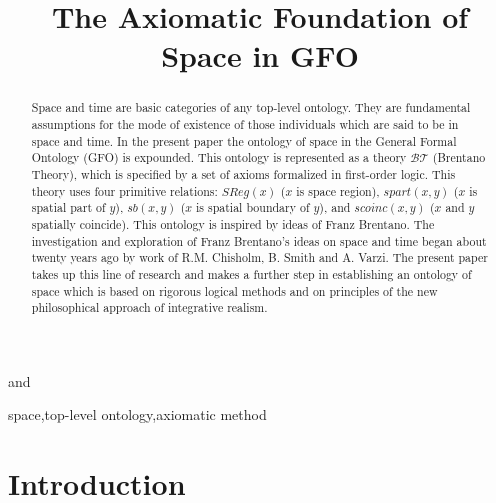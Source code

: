 \documentclass{ao2e}
\begin{document}
\begin{frontmatter}                           \title{The Axiomatic Foundation of Space in GFO}


\author[A]{ } and
\author[B]{ }
\address[A]{Department of Intelligent Systems, University of Leipzig\\
E-mail: baumann@informatik.uni-leipzig.de}
\address[B]{Institute for Medical Informatics, Statistics and Epidemiology,
University of Leipzig\\
E-mail: heinrich.herre@imise.uni-leipzig.de}

\begin{abstract}
Space and time are basic categories of any top-level ontology. They are fundamental assumptions for
the mode of existence of those individuals which are said to be in space and time. 
In the present paper the ontology of space in the General Formal Ontology (GFO) is expounded.
This ontology  is represented as a theory $\mathcal{BT}$ (Brentano Theory), which is specified by a set of axioms formalized in first-order logic.
This theory uses four primitive relations: $SReg(x)$ ($x$ is space region),
$spart(x,y)$ ($x$ is spatial part of $y$), $sb(x,y)$ ($x$ is spatial boundary of $y$), and $scoinc(x,y)$ ($x$ and $y$
spatially coincide). This ontology is inspired by ideas of Franz Brentano.
The investigation and exploration of Franz Brentano's ideas on space and time
began about twenty years ago by work of R.M. Chisholm, B. Smith and A. Varzi. 
The present paper takes up this line of research and makes a further step in establishing an ontology of space
which is based on rigorous logical methods and on principles of the new philosophical approach of
integrative realism.


\end{abstract}

\begin{keyword}
space\sep top-level ontology\sep axiomatic method
\end{keyword}

\end{frontmatter}





\section{Introduction}
\end{document}
